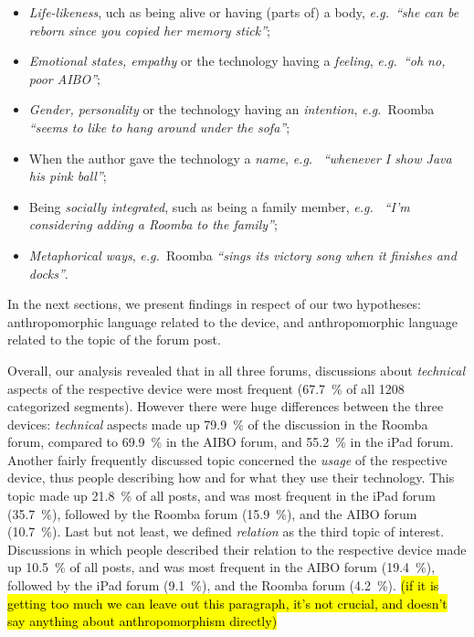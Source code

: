 \documentclass{frontiersSCNS} %
\newcommand{\eg}{{\textit{e.g.~}}}
\begin{document}
\begin{itemize}
    \item \textit{Life-likeness}, uch as being alive or having (parts of) a
        body, \eg \textit{``she can be reborn since you copied her memory
        stick''};

    \item \textit{Emotional states, empathy} or the technology having a
        \textit{feeling}, \eg \textit{``oh no, poor AIBO''};

    \item \textit{Gender, personality} or the technology having an
        \textit{intention}, \eg Roomba \textit{``seems to like to hang around
        under the sofa''};

    \item When the author gave the technology a \textit{name}, \eg
        \textit{``whenever I show Java his pink ball''};

    \item Being \textit{socially integrated}, such as being a family member, \eg
        \textit{``I'm considering adding a Roomba to the family''};

    \item \textit{Metaphorical ways}, \eg Roomba \textit{``sings its victory
        song when it finishes and docks''}.

\end{itemize}

In the next sections, we present findings in respect of our two hypotheses:
anthropomorphic language related to the device, and anthropomorphic language
related to the topic of the forum post.

Overall, our analysis revealed that in all three forums, discussions about
\textit{technical} aspects of the respective device were most frequent (67.7~\%
of all 1208 categorized segments). However there were huge differences between
the three devices: \textit{technical} aspects made up 79.9~\% of the discussion
in the Roomba forum, compared to 69.9~\% in the AIBO forum, and 55.2~\% in the
iPad forum. Another fairly frequently discussed topic concerned the
\textit{usage} of the respective device, thus people describing how and for what
they use their technology. This topic made up 21.8~\% of all posts, and was most
frequent in the iPad forum (35.7~\%), followed by the Roomba forum (15.9~\%),
and the AIBO forum (10.7~\%). Last but not least, we defined \textit{relation}
as the third topic of interest. Discussions in which people described their
relation to the respective device made up 10.5~\% of all posts, and was most
frequent in the AIBO forum (19.4~\%), followed by the iPad forum (9.1~\%), and
the Roomba forum (4.2~\%). \hl{(if it is getting too much we can leave out this
paragraph, it's not crucial, and doesn't say anything about anthropomorphism
directly)}
\end{document}
